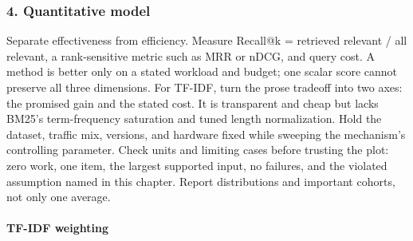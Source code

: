 \subsubsection*{4. Quantitative model}
Separate effectiveness from efficiency. Measure Recall@k = retrieved relevant / all relevant, a rank-sensitive metric such as MRR or nDCG, and query cost. A method is better only on a stated workload and budget; one scalar score cannot preserve all three dimensions.
For TF-IDF, turn the prose tradeoff into two axes: the promised gain and the stated cost. It is transparent and cheap but lacks BM25's term-frequency saturation and tuned length normalization. Hold the dataset, traffic mix, versions, and hardware fixed while sweeping the mechanism's controlling parameter.
Check units and limiting cases before trusting the plot: zero work, one item, the largest supported input, no failures, and the violated assumption named in this chapter. Report distributions and important cohorts, not only one average.
\paragraph{TF-IDF weighting}
